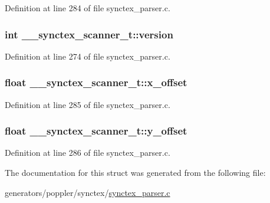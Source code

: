 Definition at line 284 of file synctex\+\_\+parser.\+c.

\hypertarget{struct____synctex__scanner__t_ad7c390700b8d63577dbd959a8a3310e7}{
\subsubsection[{version}]{\setlength{\rightskip}{0pt plus 5cm}int \+\_\+\+\_\+synctex\+\_\+scanner\+\_\+t\+::version}}\label{struct____synctex__scanner__t_ad7c390700b8d63577dbd959a8a3310e7}


Definition at line 274 of file synctex\+\_\+parser.\+c.

\hypertarget{struct____synctex__scanner__t_aa6abb8a43f2d6c768736bd1e88fff5a0}{
\subsubsection[{x\+\_\+offset}]{\setlength{\rightskip}{0pt plus 5cm}float \+\_\+\+\_\+synctex\+\_\+scanner\+\_\+t\+::x\+\_\+offset}}\label{struct____synctex__scanner__t_aa6abb8a43f2d6c768736bd1e88fff5a0}


Definition at line 285 of file synctex\+\_\+parser.\+c.

\hypertarget{struct____synctex__scanner__t_a0f0c39c893f6812770fe5665de04302f}{
\subsubsection[{y\+\_\+offset}]{\setlength{\rightskip}{0pt plus 5cm}float \+\_\+\+\_\+synctex\+\_\+scanner\+\_\+t\+::y\+\_\+offset}}\label{struct____synctex__scanner__t_a0f0c39c893f6812770fe5665de04302f}


Definition at line 286 of file synctex\+\_\+parser.\+c.



The documentation for this struct was generated from the following file\+:\begin{DoxyCompactItemize}
\item 
generators/poppler/synctex/\hyperlink{synctex__parser_8c}{synctex\+\_\+parser.\+c}\end{DoxyCompactItemize}
